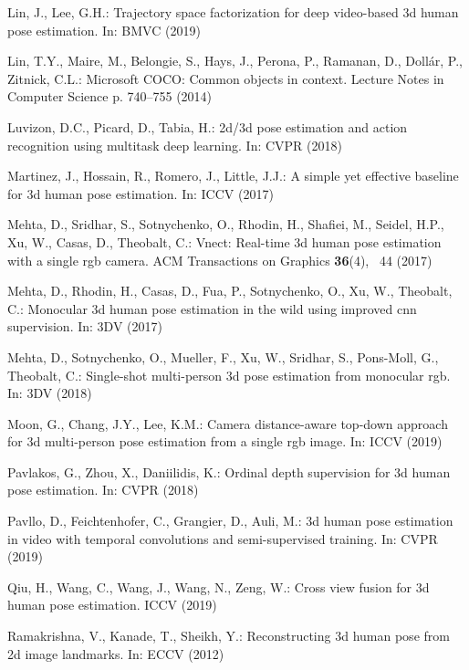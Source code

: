 \documentclass[runningheads, envcountsame, a4paper]{llncs}
\begin{document}
\begin{thebibliography}{10}
Lin, J., Lee, G.H.: Trajectory space factorization for deep video-based 3d
  human pose estimation. In: BMVC (2019)

Lin, T.Y., Maire, M., Belongie, S., Hays, J., Perona, P., Ramanan, D., Dollár,
  P., Zitnick, C.L.: Microsoft {COCO}: Common objects in context. Lecture Notes
  in Computer Science p. 740–755 (2014)

Luvizon, D.C., Picard, D., Tabia, H.: 2d/3d pose estimation and action
  recognition using multitask deep learning. In: CVPR (2018)

Martinez, J., Hossain, R., Romero, J., Little, J.J.: A simple yet effective
  baseline for 3d human pose estimation. In: ICCV (2017)

Mehta, D., Sridhar, S., Sotnychenko, O., Rhodin, H., Shafiei, M., Seidel, H.P.,
  Xu, W., Casas, D., Theobalt, C.: {Vnect}: Real-time 3d human pose estimation
  with a single rgb camera. ACM Transactions on Graphics  \textbf{36}(4), ~44
  (2017)

Mehta, D., Rhodin, H., Casas, D., Fua, P., Sotnychenko, O., Xu, W., Theobalt,
  C.: Monocular 3d human pose estimation in the wild using improved cnn
  supervision. In: 3DV (2017)

Mehta, D., Sotnychenko, O., Mueller, F., Xu, W., Sridhar, S., Pons-Moll, G.,
  Theobalt, C.: Single-shot multi-person 3d pose estimation from monocular rgb.
  In: 3DV (2018)

Moon, G., Chang, J.Y., Lee, K.M.: Camera distance-aware top-down approach for
  3d multi-person pose estimation from a single rgb image. In: ICCV (2019)

Pavlakos, G., Zhou, X., Daniilidis, K.: Ordinal depth supervision for 3d human
  pose estimation. In: CVPR (2018)

Pavllo, D., Feichtenhofer, C., Grangier, D., Auli, M.: 3d human pose estimation
  in video with temporal convolutions and semi-supervised training. In: CVPR
  (2019)

Qiu, H., Wang, C., Wang, J., Wang, N., Zeng, W.: Cross view fusion for 3d human
  pose estimation. ICCV  (2019)

Ramakrishna, V., Kanade, T., Sheikh, Y.: Reconstructing 3d human pose from 2d
  image landmarks. In: ECCV (2012)


\end{thebibliography}
\end{document}
